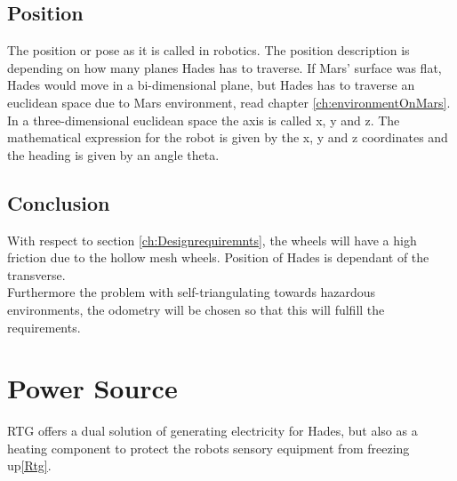 \subsection{Position}
The position or pose as it is called in robotics. The position description is depending on how many planes Hades has to traverse. If Mars' surface was flat, Hades would move in a bi-dimensional plane, but Hades has to traverse an euclidean space due to Mars environment, read chapter \ref{ch:environmentOnMars}.
In a three-dimensional euclidean space the axis is called x, y and z. The mathematical expression for the robot is given by the x, y and z coordinates and the heading is given by an angle theta.



\subsection{Conclusion}
With respect to section \ref{ch:Designrequiremnts}, the wheels will have a high friction due to the hollow mesh wheels. Position of Hades is dependant of the transverse.\\
Furthermore the problem with self-triangulating towards hazardous environments, the odometry will be chosen so that this will fulfill the requirements.

\section{Power Source}
RTG offers a dual solution of generating electricity for Hades, but also as a heating component to protect the robots sensory equipment from freezing up\ref{Rtg}.


